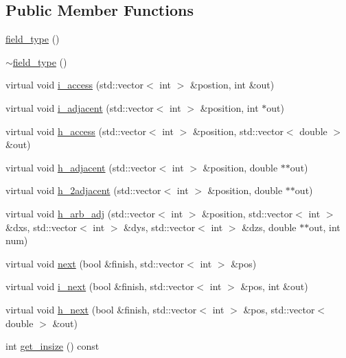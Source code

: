 \subsection*{Public Member Functions}
\begin{DoxyCompactItemize}
\item 
\hyperlink{classfield__type_a57c28e2caacf2ff4422ea1206cf0efae}{field\+\_\+type} ()
\item 
\hyperlink{classfield__type_aabdd13b4a98dcabc63b75867c80ceae3}{$\sim$field\+\_\+type} ()
\item 
virtual void \hyperlink{classfield__type_a0941f94d7f73234d02c69faf2a0f6e5e}{i\+\_\+access} (std\+::vector$<$ int $>$ \&postion, int \&out)
\item 
virtual void \hyperlink{classfield__type_aaaea375b4de0d0ef9ca4427832611584}{i\+\_\+adjacent} (std\+::vector$<$ int $>$ \&position, int $\ast$out)
\item 
virtual void \hyperlink{classfield__type_ada65523f1a000cbd929f2d97d747fa59}{h\+\_\+access} (std\+::vector$<$ int $>$ \&position, std\+::vector$<$ double $>$ \&out)
\item 
virtual void \hyperlink{classfield__type_af91a0a4b7d3076c41baa96f25faec0c4}{h\+\_\+adjacent} (std\+::vector$<$ int $>$ \&position, double $\ast$$\ast$out)
\item 
virtual void \hyperlink{classfield__type_a77964e0d6f8d20c9a1ec579847570c4c}{h\+\_\+2adjacent} (std\+::vector$<$ int $>$ \&position, double $\ast$$\ast$out)
\item 
virtual void \hyperlink{classfield__type_a293169a5ca7f03b818c0aa92410a5078}{h\+\_\+arb\+\_\+adj} (std\+::vector$<$ int $>$ \&position, std\+::vector$<$ int $>$ \&dxs, std\+::vector$<$ int $>$ \&dys, std\+::vector$<$ int $>$ \&dzs, double $\ast$$\ast$out, int num)
\item 
virtual void \hyperlink{classfield__type_afaf4b3449a0ee906ebe543439054eab5}{next} (bool \&finish, std\+::vector$<$ int $>$ \&pos)
\item 
virtual void \hyperlink{classfield__type_a0785839e047ace8841ded448d49900ca}{i\+\_\+next} (bool \&finish, std\+::vector$<$ int $>$ \&pos, int \&out)
\item 
virtual void \hyperlink{classfield__type_a4f68c166bbd86806584f44c6d6faf50f}{h\+\_\+next} (bool \&finish, std\+::vector$<$ int $>$ \&pos, std\+::vector$<$ double $>$ \&out)
\item 
int \hyperlink{classfield__type_a3049cba266e811fcd2bc85795bf90bab}{get\+\_\+insize} () const 
\item 
$$
\end{DoxyCompactItemize}
